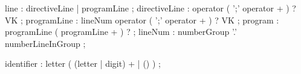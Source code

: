 \documentclass{article}
\begin{document}
\thispagestyle{firstpage}


\begin{rail}

line  : directiveLine | programLine ;
directiveLine : operator ( ';' operator + ) ? VK ;
programLine : lineNum operator ( ';' operator + ) ? VK ;
program : programLine ( programLine + ) ? ;
lineNum : numberGroup '.' numberLineInGroup ;

identifier : letter ( (letter | digit) + | () ) ;

\end{rail}

\pagestyle{otherpages}

\setcounter{page}{21}

\newpage
\end{document}

